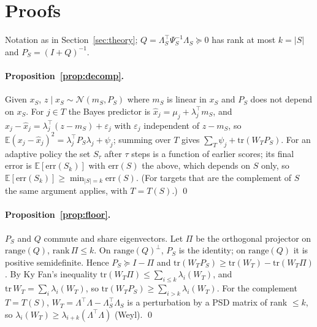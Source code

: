 \section{Proofs}
\label{app:proofs}
Notation as in Section~\ref{sec:theory}; $Q=\Lambda_S^\top\Psi_S^{-1}\Lambda_S\succeq0$ has rank at most $k=|S|$ and $P_S=(I+Q)^{-1}$.

\paragraph{Proposition~\ref{prop:decomp}.}
Given $x_S$, $z\mid x_S\sim\mathcal N(m_S,P_S)$ where $m_S$ is linear in $x_S$ and $P_S$ does not depend on $x_S$.
For $j\in T$ the Bayes predictor is $\hat x_j=\mu_j+\lambda_j^\top m_S$, and $x_j-\hat x_j=\lambda_j^\top(z-m_S)+\varepsilon_j$ with $\varepsilon_j$ independent of $z-m_S$, so $\mathbb{E}(x_j-\hat x_j)^2=\lambda_j^\top P_S\lambda_j+\psi_j$; summing over $T$ gives $\sum_{T}\psi_j+\mathrm{tr}(W_TP_S)$.
For an adaptive policy the set $S_\tau$ after $\tau$ steps is a function of earlier scores; its final error is $\mathbb{E}[\mathrm{err}(S_k)]$ with $\mathrm{err}(S)$ the above, which depends on $S$ only, so $\mathbb{E}[\mathrm{err}(S_k)]\ge\min_{|S|=k}\mathrm{err}(S)$. (For targets that are the complement of $S$ the same argument applies, with $T=T(S)$.) \qed

\paragraph{Proposition~\ref{prop:floor}.}
$P_S$ and $Q$ commute and share eigenvectors. Let $\Pi$ be the orthogonal projector on $\mathrm{range}(Q)$, $\mathrm{rank}\,\Pi\le k$. On $\mathrm{range}(Q)^\perp$, $P_S$ is the identity; on $\mathrm{range}(Q)$ it is positive semidefinite. Hence $P_S\succeq I-\Pi$ and $\mathrm{tr}(W_TP_S)\ge\mathrm{tr}(W_T)-\mathrm{tr}(W_T\Pi)$.
By Ky Fan's inequality $\mathrm{tr}(W_T\Pi)\le\sum_{i\le k}\lambda_i(W_T)$, and $\mathrm{tr}\,W_T=\sum_i\lambda_i(W_T)$, so $\mathrm{tr}(W_TP_S)\ge\sum_{i>k}\lambda_i(W_T)$. For the complement $T=T(S)$, $W_T=\Lambda^\top\Lambda-\Lambda_S^\top\Lambda_S$ is a perturbation by a PSD matrix of rank $\le k$, so $\lambda_i(W_T)\ge\lambda_{i+k}(\Lambda^\top\Lambda)$ (Weyl). \qed

